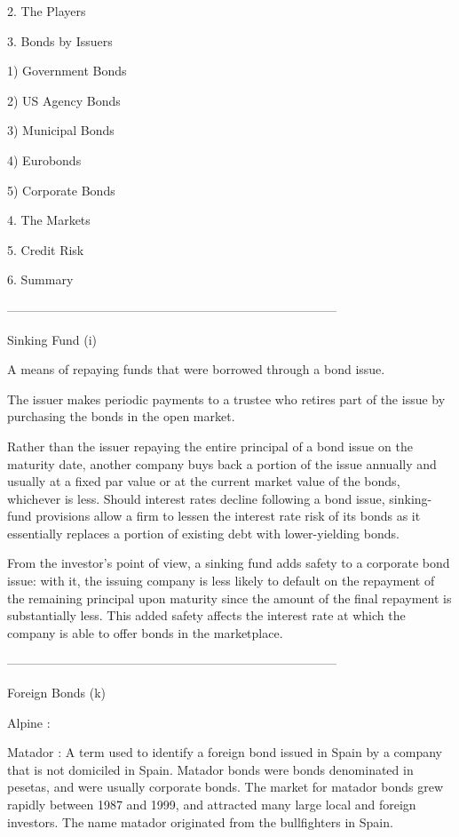 2. The Players

3. Bonds by Issuers

1) Government Bonds

2) US Agency Bonds

3) Municipal Bonds

4) Eurobonds

5) Corporate Bonds


4. The Markets

5. Credit Risk

6. Summary




--------------------------------------------------------------------------------


Sinking Fund  (i)

A means of repaying funds that were borrowed through a bond issue. 

The issuer makes periodic payments to a trustee who retires part of the issue by purchasing the bonds in the open market.


Rather than the issuer repaying the entire principal of a bond issue on the maturity date,  another company buys back a portion of the issue annually and usually at a fixed par value or at the current market value of the bonds, whichever is less. Should interest rates decline following a bond issue, sinking-fund provisions allow a firm to lessen the interest rate risk of its bonds as it essentially replaces a portion of existing debt with lower-yielding bonds.


From the investor's point of view, a sinking fund adds safety to a corporate bond issue: with it, the issuing company is less likely to default on the repayment of the remaining principal upon maturity since the amount of the final repayment is substantially less. This added safety affects the interest rate at which the company is able to offer bonds in the marketplace.





--------------------------------------------------------------------------------


Foreign Bonds (k)


Alpine : 


Matador : A term used to identify a foreign bond issued in Spain by a company that is not domiciled in Spain. Matador bonds were bonds denominated in pesetas, and were usually corporate bonds. The market for matador bonds grew rapidly between 1987 and 1999, and attracted many large local and foreign investors. The name matador originated from the bullfighters in Spain.

